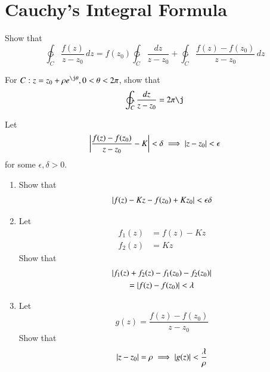 \documentclass[journal,12pt,twocolumn]{IEEEtran}
\begin{document}
\section{Cauchy's Integral Formula}
\begin{problem}
Show that
\begin{equation}
\ointctrclockwise_C \frac{f(z)}{z-z_0}\,dz =  f(z_0)\ointctrclockwise_C \frac{dz}{z-z_0} + \ointctrclockwise_C \frac{f(z)-f(z_0)}{z-z_0}\,dz
\end{equation}
\end{problem}
\begin{problem}
For $C:z = z_0+\rho e^{\j\theta}, 0 < \theta < 2\pi$, show that
\begin{equation}
\ointctrclockwise_C \frac{dz}{z-z_0} = 2\pi \j
\end{equation}
\end{problem}
%
\begin{problem}
Let
\begin{equation}
\left\vert\frac{f(z)-f(z_0)}{z-z_0} - K\right\vert < \delta \implies \left\vert z-z_0\right\vert < \epsilon
\end{equation}
for some $\epsilon, \delta > 0$.  
\begin{enumerate}
\item
Show that 
\begin{equation}
\left\vert f(z)-Kz -f(z_0)+Kz_0\right\vert < \epsilon\delta
\end{equation}
\item Let
\begin{align}
f_1(z) &=  f(z)-Kz
\\
f_2(z) &= Kz 
\end{align}
Show that 
\begin{multline}
\left\vert f_1(z)+f_2(z)-f_1(z_0)-f_2(z_0)\right\vert 
\\
= \left\vert f(z)-f(z_0)\right\vert < \lambda
\end{multline}
\item Let
\begin{equation}
g(z)=\frac{f(z)-f(z_0)}{z-z_0}
\end{equation}
Show that 
\begin{equation}
\left\vert z-z_0\right\vert = \rho \implies
\left\vert g(z)\right\vert < \frac{\lambda}{\rho}
\end{equation}
\end{enumerate}
\end{problem}
\end{document}
